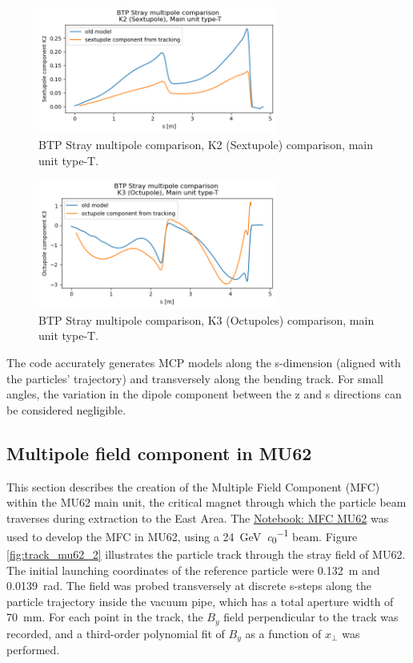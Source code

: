 \begin{figure}[H]
\centering
\includegraphics[width=0.7\textwidth]{02_Simulation/images/mcp_sextupole.png}
\caption{BTP Stray multipole comparison, K2 (Sextupole) comparison, main unit type-T.}
\label{fig:mcp_sextupole}
\end{figure}

\begin{figure}[H]
\centering
\includegraphics[width=0.7\textwidth]{02_Simulation/images/mcp_octupoles.png}
\caption{BTP Stray multipole comparison, K3 (Octupoles) comparison, main unit type-T.}
\label{fig:mcp_octupole}
\end{figure}

The code accurately generates MCP models along the s-dimension (aligned with the particles' trajectory) and transversely along the bending track. For small angles, the variation in the dipole component between the z and s directions can be considered negligible.

\subsection{Multipole field component in MU62}

This section describes the creation of the Multiple Field Component (MFC) within the MU62 main unit, the critical magnet through which the particle beam traverses during extraction to the East Area. The \href{https://gitlab.cern.ch/eljohnso/acc-models-tls-eliott-fork/-/blob/EliottBranch/ps_extraction/east-fast-extraction/mfc_mu62.ipynb}{Notebook: MFC MU62} was used to develop the MFC in MU62, using a \SI{24}{\giga\electronvolt\per\clight} beam. Figure \ref{fig:track_mu62_2} illustrates the particle track through the stray field of MU62. The initial launching coordinates of the reference particle were \SI{0.132}{\meter} and \SI{0.0139}{\radian}. The field was probed transversely at discrete s-steps along the particle trajectory inside the vacuum pipe, which has a total aperture width of \SI{70}{\milli\meter}. For each point in the track, the $B_{y}$ field perpendicular to the track was recorded, and a third-order polynomial fit of $B_{y}$ as a function of $x_{\perp}$ was performed.

